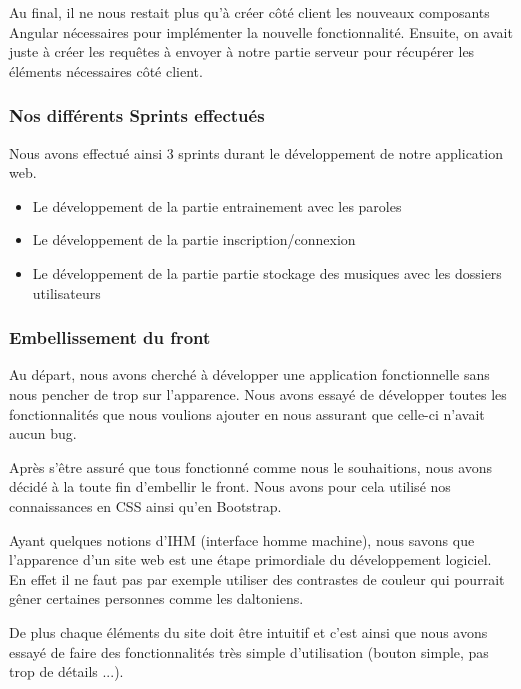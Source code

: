 \documentclass[12pt,french]{article}
\begin{document}
Au final, il ne nous restait plus qu'à créer côté client les nouveaux composants Angular nécessaires pour implémenter la nouvelle fonctionnalité. Ensuite, on avait juste à créer les requêtes à envoyer à notre partie serveur pour récupérer les éléments nécessaires côté client.



\subsubsection{Nos différents Sprints effectués}

Nous avons effectué ainsi 3 sprints durant le développement de notre application web.

\begin{itemize}
	\item Le développement de la partie entrainement avec les paroles
	\item Le développement de la partie inscription/connexion 
	\item Le développement de la partie partie stockage des musiques avec les dossiers utilisateurs 
\end{itemize}


\subsubsection{Embellissement du front}

Au départ, nous avons cherché à développer une application fonctionnelle sans nous pencher de trop sur l'apparence. Nous avons essayé de développer toutes les fonctionnalités que nous voulions ajouter en nous assurant que celle-ci n'avait aucun bug.

\medskip

Après s'être assuré que tous fonctionné comme nous le souhaitions, nous avons décidé à la toute fin d'embellir le front. Nous avons pour cela utilisé nos connaissances en CSS ainsi qu'en Bootstrap.

\medskip

Ayant quelques notions d'IHM (interface homme machine), nous savons que l'apparence d'un site web est une étape primordiale du développement logiciel. En effet il ne faut pas par exemple utiliser des contrastes de couleur qui pourrait gêner certaines personnes comme les daltoniens.

De plus chaque éléments du site doit être intuitif et c'est ainsi que nous avons essayé de faire des fonctionnalités très simple d'utilisation (bouton simple, pas trop de détails ...).
\end{document}
